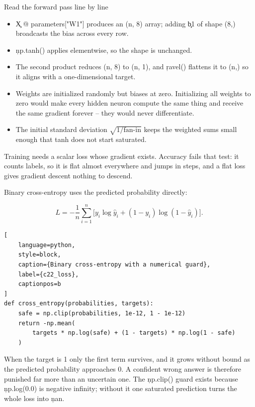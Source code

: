 \begin{SyntaxBox}{Read the forward pass line by line}
\begin{itemize}
    \item \c{X @ parameters["W1"]} produces an (n, 8) array; adding \c{b1} of
          shape (8,) broadcasts the bias across every row.
    \item \c{np.tanh()} applies elementwise, so the shape is unchanged.
    \item The second product reduces (n, 8) to (n, 1), and \c{ravel()} flattens
          it to (n,) so it aligns with a one-dimensional target.
    \item Weights are initialized randomly but biases at zero. Initializing all
          weights to zero would make every hidden neuron compute the same thing
          and receive the same gradient forever -- they would never differentiate.
    \item The initial standard deviation $\sqrt{1/\text{fan-in}}$ keeps the
          weighted sums small enough that tanh does not start saturated.
\end{itemize}
\end{SyntaxBox}


Training needs a scalar loss whose gradient exists. Accuracy fails that test: it
counts labels, so it is flat almost everywhere and jumps in steps, and a flat
loss gives gradient descent nothing to descend.

Binary cross-entropy uses the predicted probability directly:

\[
L = -\frac{1}{n}\sum_{i=1}^{n}\Big[y_i\log \hat{y}_i + (1-y_i)\log(1-\hat{y}_i)\Big].
\]

\begin{lstlisting}[
    language=python,
    style=block,
    caption={Binary cross-entropy with a numerical guard},
    label={c22_loss},
    captionpos=b
]
def cross_entropy(probabilities, targets):
    safe = np.clip(probabilities, 1e-12, 1 - 1e-12)
    return -np.mean(
        targets * np.log(safe) + (1 - targets) * np.log(1 - safe)
    )
\end{lstlisting}

When the target is 1 only the first term survives, and it grows without bound as
the predicted probability approaches 0. A confident wrong answer is therefore
punished far more than an uncertain one. The \c{np.clip()} guard exists because
\c{np.log(0.0)} is negative infinity; without it one saturated prediction turns
the whole loss into \c{nan}.

